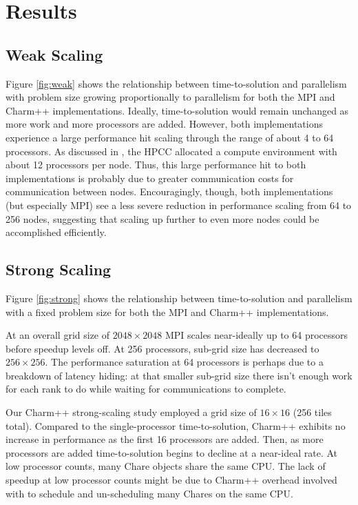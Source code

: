 \section{Results}

\subsection{Weak Scaling}



Figure \ref{fig:weak} shows the relationship between time-to-solution and parallelism with problem size growing proportionally to parallelism for both the MPI and Charm++ implementations.
Ideally, time-to-solution would remain unchanged as more work and more processors are added.
However, both implementations experience a large performance hit scaling through the range of about 4 to 64 processors.
As discussed in \label{sec:compute}, the HPCC allocated a compute environment with about 12 processors per node.
Thus, this large performance hit to both implementations is probably due to greater communication costs for communication between nodes.
Encouragingly, though, both implementations (but especially MPI) see a less severe reduction in performance scaling from 64 to 256 nodes, suggesting that scaling up further to even more nodes could be accomplished efficiently.

\subsection{Strong Scaling}



Figure \ref{fig:strong} shows the relationship between time-to-solution and parallelism with a fixed problem size for both the MPI and Charm++ implementations.

At an overall grid size of $2048 \times 2048$ MPI scales near-ideally up to 64 processors before speedup levels off.
At 256 processors, sub-grid size has decreased to $256\times256$.
The performance saturation at 64 processors is perhaps due to a breakdown of latency hiding: at that smaller sub-grid size there isn't enough work for each rank to do while waiting for communications to complete.

Our Charm++ strong-scaling study employed a grid size of $16 \times 16$ (256 tiles total).
Compared to the single-processor time-to-solution, Charm++ exhibits no increase in performance as the first 16 processors are added.
Then, as more processors are added time-to-solution begins to decline at a near-ideal rate.
At low processor counts, many Chare objects share the same CPU.
The lack of speedup at low processor counts might be due to Charm++ overhead involved with to schedule and un-scheduling many Chares on the same CPU.


